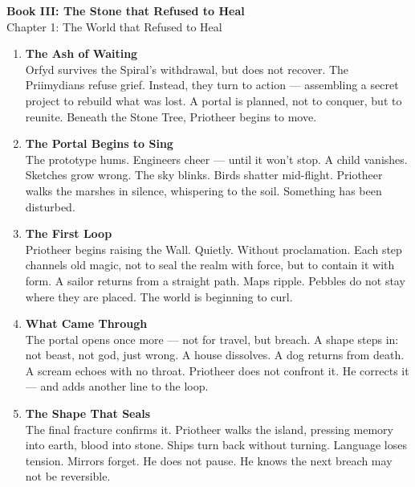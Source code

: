 \documentclass[9pt]{article}
\begin{document}
\begin{center}
    \Large\textbf{Book III: The Stone that Refused to Heal} \\
    \large Chapter 1: The World that Refused to Heal\\
\end{center}

\vspace{1in}


\begin{enumerate}
    \item \textbf{The Ash of Waiting} \\
    Orfyd survives the Spiral’s withdrawal, but does not recover. The Priimydians refuse grief. Instead, they turn to action — assembling a secret project to rebuild what was lost. A portal is planned, not to conquer, but to reunite. Beneath the Stone Tree, Priotheer begins to move.

    \vspace{1em}
    \item \textbf{The Portal Begins to Sing} \\
    The prototype hums. Engineers cheer — until it won’t stop. A child vanishes. Sketches grow wrong. The sky blinks. Birds shatter mid-flight. Priotheer walks the marshes in silence, whispering to the soil. Something has been disturbed.

    \vspace{1em}
    \item \textbf{The First Loop} \\
    Priotheer begins raising the Wall. Quietly. Without proclamation. Each step channels old magic, not to seal the realm with force, but to contain it with form. A sailor returns from a straight path. Maps ripple. Pebbles do not stay where they are placed. The world is beginning to curl.

    \vspace{1em}
    \item \textbf{What Came Through} \\
    The portal opens once more — not for travel, but breach. A shape steps in: not beast, not god, just wrong. A house dissolves. A dog returns from death. A scream echoes with no throat. Priotheer does not confront it. He corrects it — and adds another line to the loop.

    \vspace{1em}
    \item \textbf{The Shape That Seals} \\
    The final fracture confirms it. Priotheer walks the island, pressing memory into earth, blood into stone. Ships turn back without turning. Language loses tension. Mirrors forget. He does not pause. He knows the next breach may not be reversible.


\end{enumerate}
\end{document}
